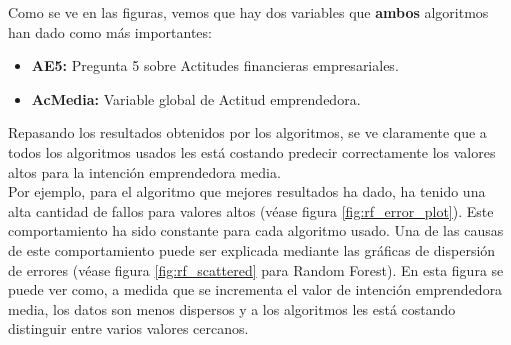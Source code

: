 Como se ve en las figuras, vemos que hay dos variables que \textbf{ambos} algoritmos han dado como más importantes:
\begin{itemize}
	\item\textbf{AE5:} Pregunta  5 sobre Actitudes financieras empresariales.
	\item\textbf{AcMedia:} Variable global de Actitud emprendedora.
\end{itemize} 
Repasando los resultados obtenidos por los algoritmos, se ve claramente que a todos los algoritmos usados les está costando predecir correctamente los valores altos para la intención emprendedora media.
 \\
\linebreak
Por ejemplo, para el algoritmo que mejores resultados ha dado, ha tenido una alta cantidad de fallos para  valores altos (véase figura \ref{fig:rf_error_plot}). Este comportamiento ha sido constante para cada algoritmo usado. Una de las causas de este comportamiento puede ser explicada mediante las gráficas de dispersión de errores (véase figura \ref{fig:rf_scattered} para Random Forest). En esta figura se puede ver como, a medida que se incrementa el valor de intención emprendedora media, los datos son menos dispersos y a los algoritmos les está costando distinguir entre varios valores cercanos.
